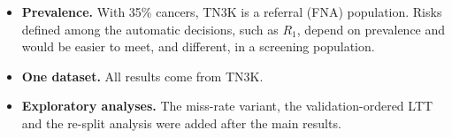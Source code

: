 \begin{itemize}
        5 epochs instead of 500. The large-model runs used one seed each, and the validation AUC of
        the low-learning-rate 7B run was still rising at the last epoch, so a tuned 7B model was
        not tested. XGBoost was not tuned.
  \item \textbf{Prevalence.} With 35\% cancers, TN3K is a referral (FNA) population. Risks
        defined among the automatic decisions, such as $R_1$, depend on prevalence and would be
        easier to meet, and different, in a screening population.
  \item \textbf{One dataset.} All results come from TN3K.
  \item \textbf{Exploratory analyses.} The miss-rate variant, the validation-ordered LTT and the
        re-split analysis were added after the main results.
\end{itemize}

